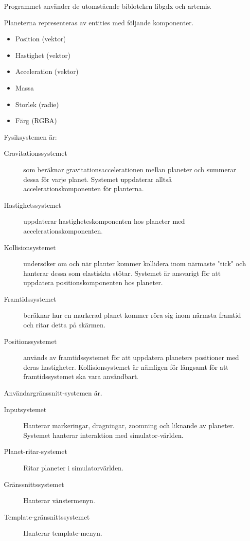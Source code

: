 Programmet använder de utomstående bibloteken libgdx och artemis.

Planeterna representeras av entities med följande komponenter.
\begin{itemize}
    \item Position (vektor)
    \item Hastighet (vektor)
    \item Acceleration (vektor)
    \item Massa
    \item Storlek (radie)
    \item Färg (RGBA)
\end{itemize}

Fysiksystemen är:
\begin{description}
    \item[Gravitationssystemet] som beräknar gravitationsaccelerationen mellan planeter
        och summerar dessa för varje planet.
        Systemet uppdaterar alltså accelerationskomponenten för planterna.
    \item[Hastighetssystemet] uppdaterar hastigheteskomponenten hos
        planeter med accelerationskomponenten.
    \item[Kollisionsystemet] undersöker om och när planter kommer kollidera
        inom närmaste "tick" och hanterar dessa som elastiskta stötar.
        Systemet är ansvarigt för att uppdatera positionskomponenten
        hos planeter.
    \item[Framtidssystemet] beräknar hur en markerad planet
        kommer röra sig inom närmsta framtid och ritar detta på skärmen.
    \item[Positionssystemet] används av framtidssystemet för att uppdatera
        planeters positioner med deras hastigheter. Kollisionsystemet
        är nämligen för långsamt för att framtidssystemet ska
        vara användbart.
\end{description}

Användargränssnitt-systemen är.
\begin{description}
    \item[Inputsystemet] Hanterar markeringar, dragningar,
        zoomning och liknande av planeter.
        Systemet hanterar interaktion med simulator-världen.
    \item[Planet-ritar-systemet] Ritar planeter i simulatorvärlden.
    \item[Gränssnittssystemet] Hanterar vänstermenyn.
    \item[Template-gränsnittssystemet] Hanterar template-menyn.
\end{description}

